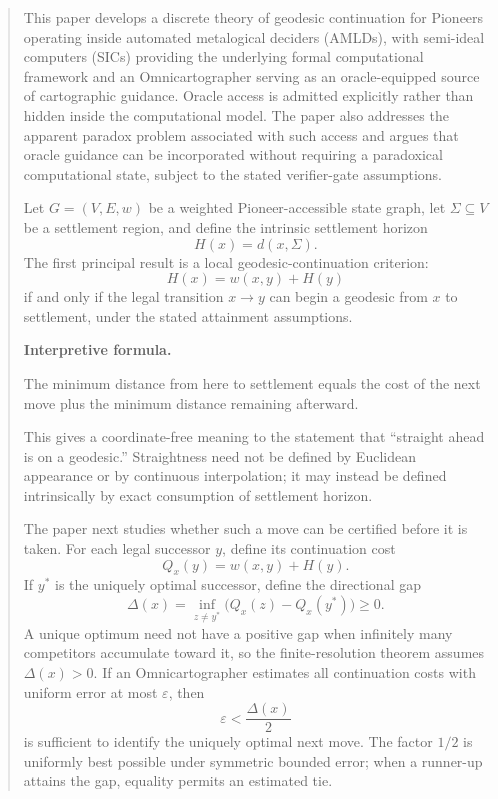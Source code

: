 \documentclass[11pt]{article}
\theoremstyle{definition}
\theoremstyle{remark}
\newcommand{\Sett}{\Sigma}
\newcommand{\Qval}{Q}
\newcommand{\Gap}{\Delta}
\newcommand{\eps}{\varepsilon}
\newenvironment{interpretiveformula}{%
  \begin{center}\begin{minipage}{0.92\linewidth}\small
  \textbf{Interpretive formula.}\ \raggedright}{\end{minipage}\end{center}}
\begin{document}
\begin{abstract}
This paper develops a discrete theory of geodesic continuation for Pioneers operating inside automated metalogical deciders (AMLDs), with semi-ideal computers (SICs) providing the underlying formal computational framework and an Omnicartographer serving as an oracle-equipped source of cartographic guidance. Oracle access is admitted explicitly rather than hidden inside the computational model. The paper also addresses the apparent paradox problem associated with such access and argues that oracle guidance can be incorporated without requiring a paradoxical computational state, subject to the stated verifier-gate assumptions.

Let $G=(V,E,w)$ be a weighted Pioneer-accessible state graph, let $\Sett\subseteq V$ be a settlement region, and define the intrinsic settlement horizon
\[
H(x)=d(x,\Sett).
\]
The first principal result is a local geodesic-continuation criterion:
\[
H(x)=w(x,y)+H(y)
\]
if and only if the legal transition $x\to y$ can begin a geodesic from $x$ to settlement, under the stated attainment assumptions.

\begin{interpretiveformula}
The minimum distance from here to settlement equals the cost of the next move plus the minimum distance remaining afterward.
\end{interpretiveformula}

This gives a coordinate-free meaning to the statement that ``straight ahead is on a geodesic.'' Straightness need not be defined by Euclidean appearance or by continuous interpolation; it may instead be defined intrinsically by exact consumption of settlement horizon.

The paper next studies whether such a move can be certified before it is taken. For each legal successor $y$, define its continuation cost
\[
\Qval_x(y)=w(x,y)+H(y).
\]
If $y^*$ is the uniquely optimal successor, define the directional gap
\[
\Gap(x)=\inf_{z\neq y^*}\bigl(\Qval_x(z)-\Qval_x(y^*)\bigr)\ge 0.
\]
A unique optimum need not have a positive gap when infinitely many competitors accumulate toward it, so the finite-resolution theorem assumes $\Gap(x)>0$. If an Omnicartographer estimates all continuation costs with uniform error at most $\eps$, then
\[
\eps<\frac{\Gap(x)}{2}
\]
is sufficient to identify the uniquely optimal next move. The factor $1/2$ is uniformly best possible under symmetric bounded error; when a runner-up attains the gap, equality permits an estimated tie.


\end{abstract}
\end{document}

